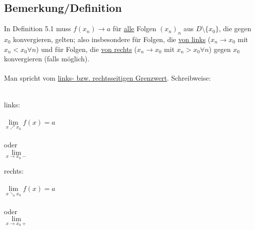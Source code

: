 \documentclass[12pt, titlepage]{article}
\renewcommand{\*}{\cdot}
\begin{document}
	\subsection{Bemerkung/Definition}
	In Definition 5.1 muss $f(x_n)\rightarrow a$ für \underline{alle} Folgen $(x_n)_n$ aus $D\setminus\{x_0\}$, die gegen $x_0$ konvergieren, gelten; also insbesondere für Folgen, die \underline{von links} ($x_n\rightarrow x_0$ mit $x_n<x_0\forall n$) und für Folgen, die \underline{von rechts} ($x_n\rightarrow x_0$ mit $x_n>x_0\forall n$) gegen $x_0$ konvergieren (falls möglich).\\
	\\
	Man spricht vom \underline{links- bzw. rechtsseitigen Grenzwert}. Schreibweise:\\
	\\
	\begin{minipage}[c]{0.5\textwidth}
		links:\\
		\\
		$\lim\limits_{x\nearrow x_0}f(x)=a$\\
		\\
		oder\\
		$\lim\limits_{x\rightarrow x_0-}$
	\end{minipage}
	\begin{minipage}[c]{0.5\textwidth}
		rechts:\\
		\\
		$\lim\limits_{x\searrow x_0}f(x)=a$\\
		\\
		oder\\
		$\lim\limits_{x\rightarrow x_0+}$
	\end{minipage}
\end{document}
